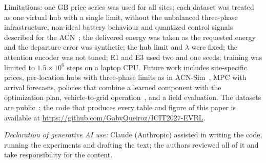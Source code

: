 \documentclass[conference]{IEEEtran}
\begin{document}
Limitations: one GB price series was used for all sites; each dataset was treated as one
virtual hub with a single limit, without the unbalanced three-phase infrastructure, non-ideal
battery behaviour and quantized control signals described for the ACN~\cite{lee2021acn}; the delivered energy was taken as the
requested energy and the departure error was synthetic; the hub limit and $\lambda$ were fixed; the
attention encoder was not tuned; E1 and E3 used two and one seeds; training was limited to
$1.5\times10^6$ steps on a laptop CPU. Future work includes site-specific
prices, per-location hubs with three-phase limits as in ACN-Sim~\cite{lee2021acnsim}, MPC with arrival
forecasts, policies that combine a learned component with the optimization plan, vehicle-to-grid
operation~\cite{orfanoudakis2025ev2gym}, and a field evaluation. The datasets are
public~\cite{paloalto,dundee,perth,sorensen2021data,elexon}; the code that produces every table and
figure of this paper is available at \url{https://github.com/GabyQueiroz/ICIT2027-EVRL}.

\textit{Declaration of generative AI use:} Claude (Anthropic) assisted in writing the code, running the experiments and drafting the text; the
authors reviewed all of it and take responsibility for the content.



\end{document}
